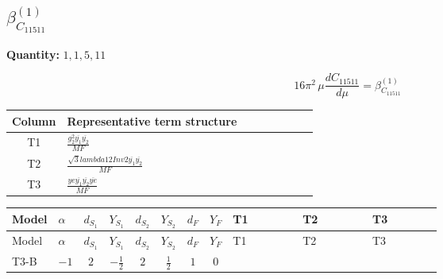 \documentclass[8pt]{article}
\begin{document}
\begin{landscape}
\section*{$\beta_{C_{11511}}^{(1)}$}
\noindent\textbf{Quantity: }$\mathrm{1,1,5,11}$\par\smallskip
\[16\pi^2\,\mu\frac{d C_{11511}}{d\mu}=\beta_{C_{11511}}^{(1)}\]
\begin{center}
\begin{tabular}{@{}c >{\raggedright\arraybackslash}p{0.82\linewidth}@{}}
\toprule
Column & Representative term structure \\
\midrule
T1 & \(\displaystyle \frac{g_{2}^{2} \overline{y_{1}} \overline{y_{2}}}{MF}\) \\
\midrule
T2 & \(\displaystyle \frac{\sqrt{3} lambda12Inv2 \overline{y_{1}} \overline{y_{2}}}{MF}\) \\
\midrule
T3 & \(\displaystyle \frac{ye \overline{y_{1}} \overline{y_{2}} \overline{ye}}{MF}\) \\
\midrule
\bottomrule
\end{tabular}
\end{center}
\smallskip
\tiny
\begin{longtable}{@{}llcccccc >{\raggedright\arraybackslash}p{0.21\linewidth} >{\raggedright\arraybackslash}p{0.21\linewidth} >{\raggedright\arraybackslash}p{0.21\linewidth}@{}}
\toprule
Model & $\alpha$ & $d_{S_1}$ & $Y_{S_1}$ & $d_{S_2}$ & $Y_{S_2}$ & $d_F$ & $Y_F$ & T1 & T2 & T3 \\
\midrule
\endfirsthead
\toprule
Model & $\alpha$ & $d_{S_1}$ & $Y_{S_1}$ & $d_{S_2}$ & $Y_{S_2}$ & $d_F$ & $Y_F$ & T1 & T2 & T3 \\
\midrule
\endhead
T3-B & $-1$ & $2$ & $-\frac{1}{2}$ & $2$ & $\frac{1}{2}$ & $1$ & $0$ & \scriptsize\adjustbox{max width=\linewidth}{$\begin{gathered} - \frac{3 g_{2}^{2} \overline{y_{1}} \overline{y_{2}}}{4 MF}\end{gathered}$} & \scriptsize\adjustbox{max width=\linewidth}{$\begin{gathered} - \frac{\sqrt{3} lambda12Inv2 \overline{y_{1}} \overline{y_{2}}}{3 MF}\end{gathered}$} & \scriptsize\adjustbox{max width=\linewidth}{$\begin{gathered} \frac{ye \overline{y_{1}} \overline{y_{2}} \overline{ye}}{4 MF}\end{gathered}$} \\
\midrule
\bottomrule
\end{longtable}
\clearpage

\end{landscape}
\end{document}
